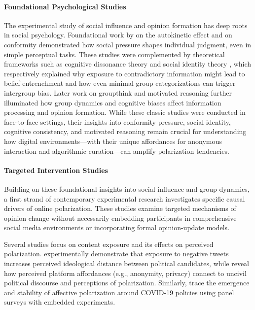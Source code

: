 \paragraph{Foundational Psychological Studies}
The experimental study of social influence and opinion formation has deep roots in social psychology. Foundational work by \citep{sherif_study_1935} on the autokinetic effect and \citep{asch_effects_1951} on conformity demonstrated how social pressure shapes individual judgment, even in simple perceptual tasks. These studies were complemented by theoretical frameworks such as cognitive dissonance theory \citep{festinger_theory_1957} and social identity theory \citep{tajfel_social_1979}, which respectively explained why exposure to contradictory information might lead to belief entrenchment and how even minimal group categorizations can trigger intergroup bias. Later work on groupthink \citep{janis_groupthink_1982} and motivated reasoning \citep{kunda_case_1990} further illuminated how group dynamics and cognitive biases affect information processing and opinion formation. While these classic studies were conducted in face-to-face settings, their insights into conformity pressure, social identity, cognitive consistency, and motivated reasoning remain crucial for understanding how digital environments—with their unique affordances for anonymous interaction and algorithmic curation—can amplify polarization tendencies.

\paragraph{Targeted Intervention Studies}
Building on these foundational insights into social influence and group dynamics, a first strand of contemporary experimental research investigates specific causal drivers of online polarization. These studies examine targeted mechanisms of opinion change without necessarily embedding participants in comprehensive social media environments or incorporating formal opinion-update models.

Several studies focus on content exposure and its effects on perceived polarization. \citep{banks_polarizedfeeds_2021} experimentally demonstrate that exposure to negative tweets increases perceived ideological distance between political candidates, while \citep{wuestenenk_influence_2023} reveal how perceived platform affordances (e.g., anonymity, privacy) connect to uncivil political discourse and perceptions of polarization. Similarly, \citep{schieferdecker_affective_2024} trace the emergence and stability of affective polarization around COVID-19 policies using panel surveys with embedded experiments.


